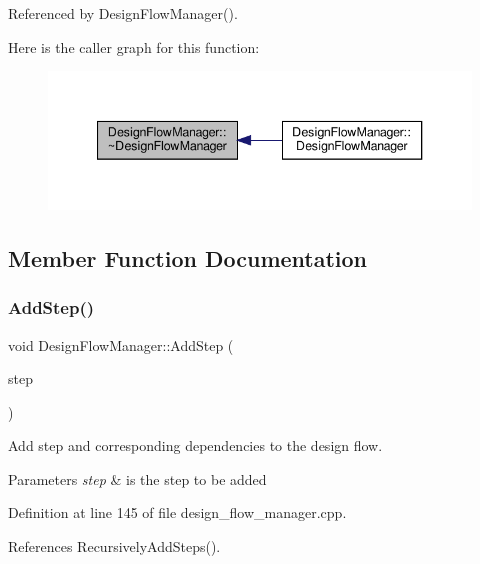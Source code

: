 Referenced by Design\+Flow\+Manager().

Here is the caller graph for this function\+:
\nopagebreak
\begin{figure}[H]
\begin{center}
\leavevmode
\includegraphics[width=340pt]{de/d63/classDesignFlowManager_a8329c2a542d8f94c55fca404c807eded_icgraph}
\end{center}
\end{figure}


\subsection{Member Function Documentation}
\mbox{\label{classDesignFlowManager_ae694a3d971e944cd6349ef7c3dd0eff7}} 
\subsubsection{\texorpdfstring{Add\+Step()}{AddStep()}}
{\footnotesize\ttfamily void Design\+Flow\+Manager\+::\+Add\+Step (\begin{DoxyParamCaption}\item[{const \hyperlink{design__flow__step_8hpp_a9dd6b4474ddf52d41a78b1aaa12ae6c8}{Design\+Flow\+Step\+Ref}}]{step }\end{DoxyParamCaption})}



Add step and corresponding dependencies to the design flow. 


\begin{DoxyParams}{Parameters}
{\em step} & is the step to be added \\
\hline
\end{DoxyParams}


Definition at line 145 of file design\+\_\+flow\+\_\+manager.\+cpp.



References Recursively\+Add\+Steps().

